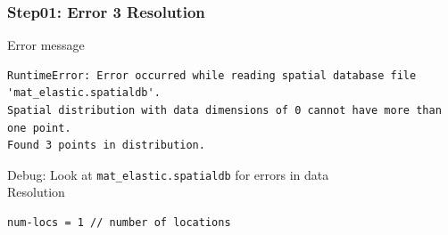\documentclass[aspectration=169]{beamer}
\newcommand{\errlabel}[1]{{\small \color{blue}#1}}
\newcommand{\debuginfo}[1]{{\small \color{green}#1}}
\begin{document}
\begin{frame}[fragile]
  \frametitle{Step01: Error 3 Resolution}

\errlabel{Error message}
\begin{lstlisting}
RuntimeError: Error occurred while reading spatial database file 'mat_elastic.spatialdb'.
Spatial distribution with data dimensions of 0 cannot have more than one point.
Found 3 points in distribution.
\end{lstlisting}\pause
\errlabel{Debug:} \debuginfo{Look at {\tt mat\_elastic.spatialdb} for errors in data}\pause\\
\errlabel{Resolution}
\begin{lstlisting}
num-locs = 1 // number of locations
\end{lstlisting}
  
\end{frame}
\end{document}
